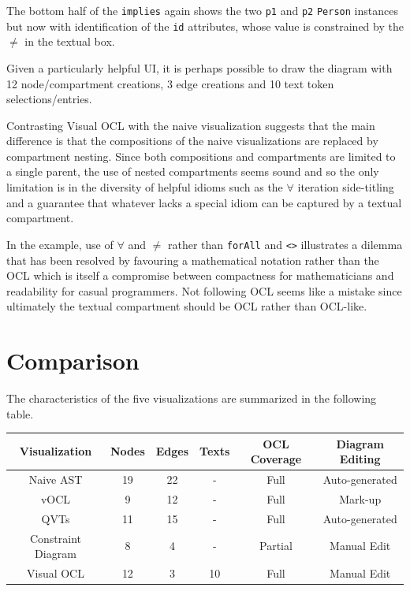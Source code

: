 \documentclass{llncs}
\begin{document}
The bottom half of the \verb$implies$ again shows the two \verb$p1$ and \verb$p2$ \verb$Person$ instances but now with identification of the \verb$id$ attributes, whose value is constrained by the $\neq$ in the textual box.

Given a particularly helpful UI, it is perhaps possible to draw the diagram with 12 node/compartment creations, 3 edge creations and 10 text token selections/entries.

Contrasting Visual OCL with the naive visualization suggests that the main difference is that the compositions of the naive visualizations are replaced by compartment nesting. Since both compositions and compartments are limited to a single parent, the use of nested compartments seems sound and so the only limitation is in the diversity of helpful idioms such as the $\forall$ iteration side-titling and a guarantee that whatever lacks a special idiom can be captured by a textual compartment.

In the example, use of $\forall$ and $\neq$ rather than \verb$forAll$ and \verb$<>$ illustrates a dilemma that has been resolved  by favouring a mathematical notation rather than the OCL which is itself a compromise between compactness for mathematicians and readability for casual programmers. Not following OCL seems like a mistake since ultimately the textual compartment should be OCL rather than OCL-like.

\section{Comparison}\label{Comparison}

The characteristics of the five visualizations are summarized in the following table.

\begin{center}
	\begin{tabular}{|| c || c | c | c | c | c ||} 
		\hline
		\hline
		Visualization & Nodes & Edges & Texts & OCL Coverage & Diagram Editing \\ 
		\hline
		\hline
		Naive AST & 19 & 22 & - & Full & Auto-generated \\ 
		\hline
		vOCL & 9 & 12 & - & Full & Mark-up \\ 
		\hline
		QVTs & 11 & 15 & - & Full & Auto-generated \\ 
		\hline
		Constraint Diagram & 8 & 4 & - & Partial & Manual Edit \\ 
		\hline
		Visual OCL & 12 & 3 & 10 & Full & Manual Edit \\ 
		\hline
		\hline
	\end{tabular}
\end{center}
\end{document}
